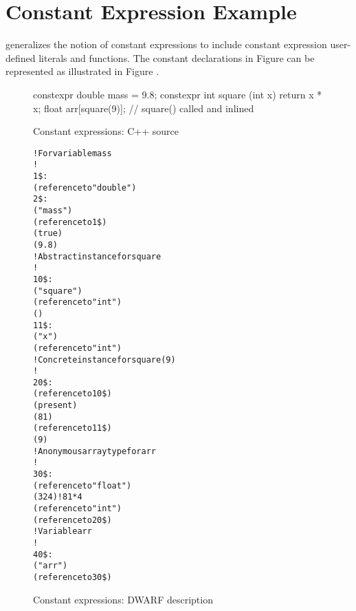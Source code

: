 \vspace*{0.4\baselineskip}
\section{Constant Expression Example}
\label{app:constantexpressionexample}
 generalizes the notion of constant expressions to include
constant expression user-defined literals and functions.
The constant declarations in Figure 
can be represented as illustrated in 
Figure .

\begin{figure}[ht]
\begin{nlnlisting}
constexpr double mass = 9.8;
constexpr int square (int x) { return x * x; }
float arr[square(9)]; // square() called and inlined
\end{nlnlisting}
\caption{Constant expressions: C++ source} \label{fig:constantexpressionscsource}
\end{figure}

\begin{figure}[!ht]
\begin{dwflisting}
\begin{alltt}
        ! For variable mass
        !
1\$:     \DWTAGconsttype
            \DWATtype(reference to "double")
2\$:     \DWTAGvariable
            \DWATname("mass")
            \DWATtype(reference to 1\$)
            \DWATconstexpr(true)
            \DWATconstvalue(9.8)
        ! Abstract instance for square
        !
10\$:    \DWTAGsubprogram
            \DWATname("square")
            \DWATtype(reference to "int")
            \DWATinline(\DWINLinlined)
11\$:        \DWTAGformalparameter
                \DWATname("x")
                \DWATtype(reference to "int")
        ! Concrete instance for square(9)
        ! 
20\$:    \DWTAGinlinedsubroutine
            \DWATabstractorigin(reference to 10\$)
            \DWATconstexpr(present)
            \DWATconstvalue(81)
            \DWTAGformalparameter
                \DWATabstractorigin(reference to 11\$)
                \DWATconstvalue(9)
        ! Anonymous array type for arr
        !
30\$:    \DWTAGarraytype
            \DWATtype(reference to "float")
            \DWATbytesize(324) ! 81*4
            \DWTAGsubrangetype
                \DWATtype(reference to "int")
                \DWATupperbound(reference to 20\$)
        ! Variable arr
        !
40\$:    \DWTAGvariable
            \DWATname("arr")
            \DWATtype(reference to 30\$)
\end{alltt}
\end{dwflisting}
\caption{Constant expressions: DWARF description}
\label{fig:constantexpressionsdwarfdescription}
\end{figure}

